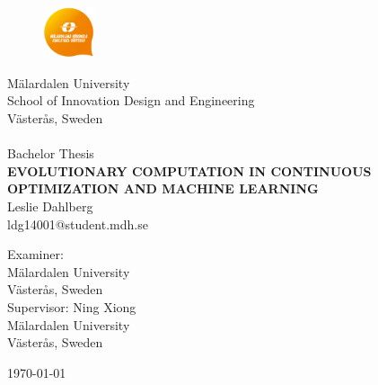 
\begin{center}
		\begin{figure}[t]
				\includegraphics[width=15mm, bb=0 0 100 100]{MDHlogga.png}
		\end{figure}
                 	\Large M\"{a}lardalen University \\
			\Large School of Innovation Design and Engineering \\
                        \Large V\"{a}ster\r{a}s, Sweden\\

                        \noindent\makebox[\linewidth]{\rule{\textwidth}{0.4pt}}\\[0.5cm]

                \Large{Bachelor Thesis}\\[2.0cm]

			\huge \textbf{\uppercase{Evolutionary computation in continuous optimization and machine learning}} \\ [2.5cm] %

			\LARGE Leslie Dahlberg \\
        	\large ldg14001@student.mdh.se \\[2.5cm]

\begin{flushleft}
			\Large Examiner: \\[0.5cm]
			\Large M\"{a}lardalen University\\
			\Large V\"{a}ster\r{a}s, Sweden\\[1.0cm]

			\Large Supervisor: Ning Xiong\\[0.5cm]
			\Large M\"{a}lardalen University\\
			\Large V\"{a}ster\r{a}s, Sweden\\[0.5cm]

\end{flushleft}

              \vspace*{\fill}
                    \large \today		%

\end{center}
